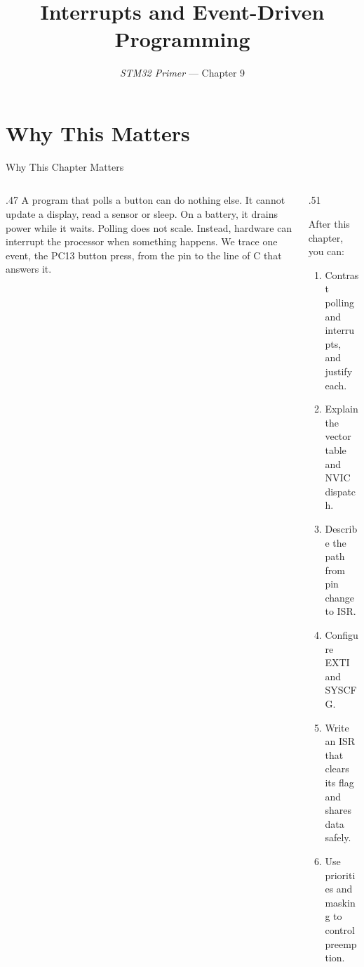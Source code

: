 \documentclass[9pt,aspectratio=169,xcolor=table]{beamer}
\title{Interrupts and Event-Driven Programming}
\subtitle{\emph{STM32 Primer} --- Chapter 9}
\begin{document}
\titlepage

\section{Why This Matters}

\begin{frame}{Why This Chapter Matters}
    \begin{columns}[T]
    \begin{column}{.47\textwidth}
        {\normalsize A program that polls a button can do nothing else. It cannot update a display, read a sensor or sleep. On a battery, it drains power while it waits. Polling does not scale. Instead, hardware can interrupt the processor when something happens. We trace one event, the PC13 button press, from the pin to the line of C that answers it.}
    \end{column}
    \begin{column}{.51\textwidth}
        \begin{block}{After this chapter, you can:}
        {\small
        \begin{enumerate}\itemsep2pt
            \item Contrast polling and interrupts, and justify each.
            \item Explain the vector table and NVIC dispatch.
            \item Describe the path from pin change to ISR.
            \item Configure EXTI and SYSCFG.
            \item Write an ISR that clears its flag and shares data safely.
            \item Use priorities and masking to control preemption.
        \end{enumerate}}
        \end{block}
    \end{column}
    \end{columns}
\end{frame}
\end{document}
